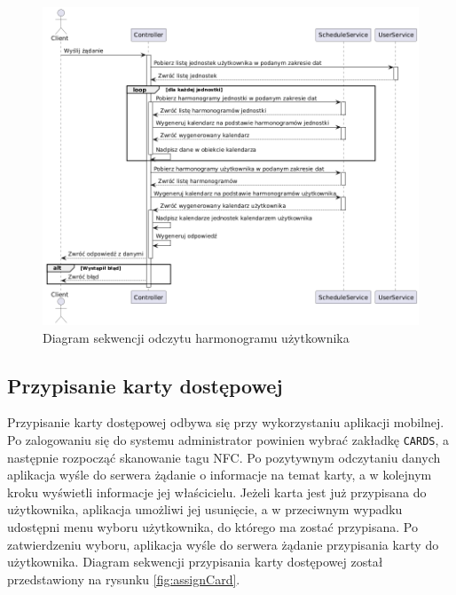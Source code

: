 \begin{figure}[H]
    \centering
    \includegraphics[width=\textwidth]{graf/schSeq.png}
    \caption{Diagram sekwencji odczytu harmonogramu użytkownika}
    \label{fig:scheduleSequence}
\end{figure}

\subsection{Przypisanie  karty dostępowej}
\label{sec:addNfc}

Przypisanie karty dostępowej odbywa się przy wykorzystaniu aplikacji mobilnej. Po zalogowaniu się do systemu administrator powinien wybrać zakładkę \texttt{CARDS}, a następnie rozpocząć skanowanie tagu NFC. Po pozytywnym odczytaniu danych aplikacja wyśle do serwera żądanie o informacje na temat karty, a w kolejnym kroku wyświetli informacje jej właścicielu. Jeżeli karta jest już przypisana do użytkownika, aplikacja umożliwi jej usunięcie, a w przeciwnym wypadku udostępni menu wyboru użytkownika, do którego ma zostać przypisana. Po zatwierdzeniu wyboru, aplikacja wyśle do serwera żądanie przypisania karty do użytkownika. Diagram sekwencji przypisania karty dostępowej został przedstawiony na rysunku \ref{fig:assignCard}.

